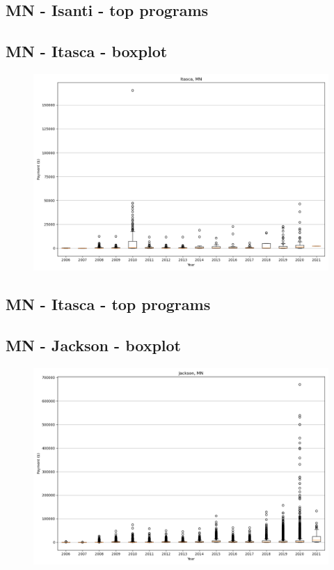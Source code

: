 \subsection*{MN - Isanti - top programs}

\newpage
\subsection*{MN - Itasca - boxplot}
\begin{figure}[h]
\centering
\includegraphics[width=7in]{../output/boxplots/counties/Itasca-MN_boxplot.png}
\end{figure}


\subsection*{MN - Itasca - top programs}

\newpage
\subsection*{MN - Jackson - boxplot}
\begin{figure}[h]
\centering
\includegraphics[width=7in]{../output/boxplots/counties/Jackson-MN_boxplot.png}
\end{figure}


